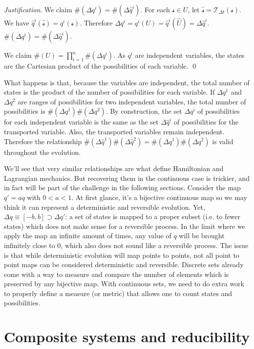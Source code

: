\documentclass[aps,pra,10pt,twocolumn,floatfix,nofootinbib]{revtex4-1}
\numberwithin{equation}{section}
\theoremstyle{definition}
\newenvironment{justification}{\emph{Justification}.}{\qed}
\begin{document}
\begin{justification}
	We claim $\#(\Delta q^i)=\#(\Delta \hat{q}^i)$. For each $\mathcal{s} \in U$, let $\hat{\mathcal{s}}=\mathcal{T}_{\Delta t}(\mathcal{s})$. We have $\hat{q}^i(\hat{\mathcal{s}}) = q^i(\mathcal{s})$. Therefore $\Delta q^i = q^i(U) = \hat{q}^i(\hat{U})=\Delta \hat{q}^i$. $\#(\Delta q^i)=\#(\Delta \hat{q}^i)$.
	
	We claim $\#(U)=\prod\limits_{i=1}^{n}\#(\Delta q^i)$. As $q^i$ are independent variables, the states are the Cartesian product of the possibilities of each variable.
\end{justification}

What happens is that, because the variables are independent, the total number of states is the product of the number of possibilities for each variable. If $\Delta q^1$ and $\Delta q^2$ are ranges of possibilities for two independent variables, the total number of possibilities is $\#(\Delta q^1) \#(\Delta q^2)$. By construction, the set $\Delta q^i$ of possibilities for each independent variable is the same as the set $\Delta \hat{q}^i$ of possibilities for the transported variable. Also, the transported variables remain independent. Therefore the relationship $\#(\Delta \hat{q}^1) \#(\Delta \hat{q}^2) = \#(\Delta q^1) \#(\Delta q^2)$ is valid throughout the evolution.

We'll see that very similar relationships are what define Hamiltonian and Lagrangian mechanics. But recovering them in the continuous case is trickier, and in fact will be part of the challenge in the following sections. Consider the map $q'=aq$ with $0<a<1$. At first glance, it's a bijective continuous map so we may think it can represent a deterministic and reversible evolution. Yet, $\Delta q \equiv [-b, b] \supset \Delta q'$: a set of states is mapped to a proper subset (i.e. to fewer states) which does not make sense for a reversible process. In the limit where we apply the map an infinite amount of times, any value of $q$ will be brought infinitely close to $0$, which also does not sound like a reversible process. The issue is that while deterministic evolution will map points to points, not all point to point maps can be considered deterministic and reversible. Discrete sets already come with a way to measure and compare the number of elements which is preserved by any bijective map. With continuous sets, we need to do extra work to properly define a measure (or metric) that allows one to count states and possibilities.

\section{Composite systems and reducibility}
\end{document}
